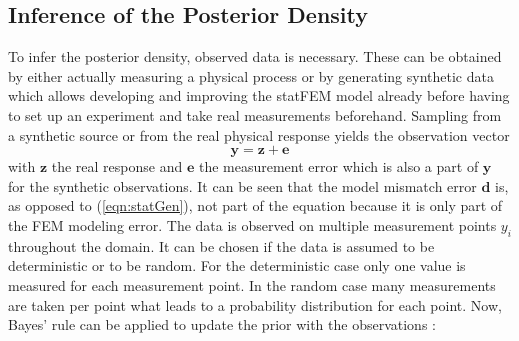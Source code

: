 \documentclass[%
  a4paper,oneside,%
  11pt,%
  smallchapters,
  style=printdev,
  extramargin,
  green,%
  rgb, <cmyk>
  ]{tubsbook}
\begin{document}
\subsection{Inference of the Posterior Density}
To infer the posterior density, observed data is necessary. These can be obtained by either actually measuring a physical process or by generating synthetic data which allows developing and improving the statFEM model already before having to set up an experiment and take real measurements beforehand.
%
Sampling from a synthetic source or from the real physical response yields the observation vector
%
\begin{equation}
\bm{y} = \bm{z} + \bm{e}
\end{equation}
%
with $\bm{z}$ the real response and $\bm{e}$ the measurement error which is also a part of $\bm{y}$ for the synthetic observations. It can be seen that the model mismatch error $\bm{d}$ is, as opposed to (\ref{eqn:statGen}), not part of the equation because it is only part of the FEM modeling error. 
%
The data is observed on multiple measurement points $y_i$ throughout the domain. It can be chosen if the data is assumed to be deterministic or to be random. For the deterministic case only one value is measured for each measurement point. In the random case many measurements are taken per point what leads to a probability distribution for each point.
%
Now, Bayes' rule can be applied to update the prior with the observations \cite{girolami2021}: 
\end{document}
